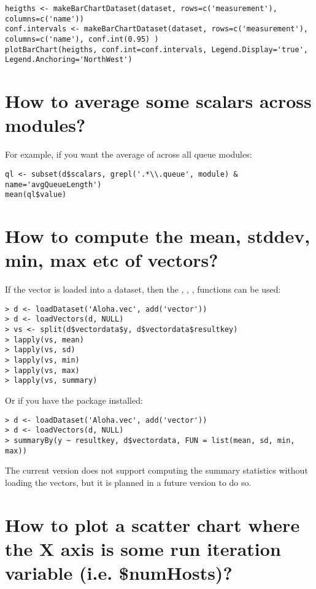 \begin{verbatim}
heigths <- makeBarChartDataset(dataset, rows=c('measurement'), columns=c('name'))
conf.intervals <- makeBarChartDataset(dataset, rows=c('measurement'), columns=c('name'), conf.int(0.95) )
plotBarChart(heigths, conf.int=conf.intervals, Legend.Display='true', Legend.Anchoring='NorthWest')
\end{verbatim}

\section{How to average some scalars across modules?}

For example, if you want the average of  across all queue modules:

\begin{verbatim}
ql <- subset(d$scalars, grepl('.*\\.queue', module) & name='avgQueueLength')
mean(ql$value)
\end{verbatim}

\section{How to compute the mean, stddev, min, max etc of vectors?}

If the vector is loaded into a dataset, then the , , , 
functions can be used:

\begin{verbatim}
> d <- loadDataset('Aloha.vec', add('vector'))
> d <- loadVectors(d, NULL)
> vs <- split(d$vectordata$y, d$vectordata$resultkey)
> lapply(vs, mean)
> lapply(vs, sd)
> lapply(vs, min)
> lapply(vs, max)
> lapply(vs, summary)
\end{verbatim}

Or if you have the  package installed:

\begin{verbatim}
> d <- loadDataset('Aloha.vec', add('vector'))
> d <- loadVectors(d, NULL)
> summaryBy(y ~ resultkey, d$vectordata, FUN = list(mean, sd, min, max))
\end{verbatim}

The current version does not support computing the summary statistics without loading the vectors,
but it is planned in a future version to do so.

\section{How to plot a scatter chart where the X axis is some run iteration
variable (i.e. \$numHosts)?}

